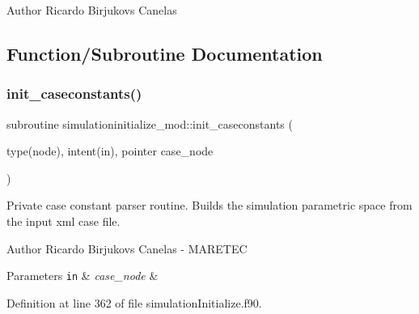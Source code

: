 \begin{DoxyAuthor}{Author}
Ricardo Birjukovs Canelas 
\end{DoxyAuthor}


\subsection{Function/\+Subroutine Documentation}
\mbox{\label{namespacesimulationinitialize__mod_ae41256ca5e72ebf27660ffdfe5c08e46}} 
\subsubsection{\texorpdfstring{init\+\_\+caseconstants()}{init\_caseconstants()}}
{\footnotesize\ttfamily subroutine simulationinitialize\+\_\+mod\+::init\+\_\+caseconstants (\begin{DoxyParamCaption}\item[{type(node), intent(in), pointer}]{case\+\_\+node }\end{DoxyParamCaption})\hspace{0.3cm}{\ttfamily [private]}}



Private case constant parser routine. Builds the simulation parametric space from the input xml case file. 

\begin{DoxyAuthor}{Author}
Ricardo Birjukovs Canelas -\/ M\+A\+R\+E\+T\+EC 
\end{DoxyAuthor}

\begin{DoxyParams}[1]{Parameters}
\mbox{\tt in}  & {\em case\+\_\+node} & \\
\hline
\end{DoxyParams}


Definition at line 362 of file simulation\+Initialize.\+f90.


